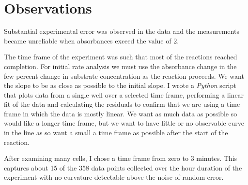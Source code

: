 \documentclass[]{tufte-handout}
\begin{document}
\section{Observations}

Substantial experimental error was observed in the data and the measurements became unreliable when absorbances exceed the value of 2. 

The time frame of the experiment was such that most of the reactions reached completion. For initial rate analysis we must use the absorbance change in the few percent change in substrate concentration as the reaction proceeds. We want the slope to be as close as possible to the initial slope. I wrote a \emph{Python} script that plots data from a single well over a selected time frame, performing a linear fit of the data and calculating the residuals to confirm that we are using a time frame in which the data is mostly linear.  We want as much data as possible so would like a longer time frame, but we want to have little or no observable curve in the line as so want a small a time frame as possible after the start of the reaction. 

After examining many cells, I chose a time frame from zero to 3 minutes. This captures about 15 of the 358 data points collected over the hour duration of the experiment with no curvature detectable above the noise of random error.
\end{document}
